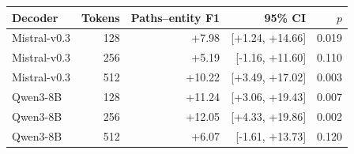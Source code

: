 \begin{tabular}{@{}lrrrr@{}}
\toprule
Decoder & Tokens & Paths--entity F1 & 95\% CI & $p$ \\
\midrule
Mistral-v0.3 & 128 & +7.98 & [+1.24, +14.66] & 0.019 \\
Mistral-v0.3 & 256 & +5.19 & [-1.16, +11.60] & 0.110 \\
Mistral-v0.3 & 512 & +10.22 & [+3.49, +17.02] & 0.003 \\
Qwen3-8B & 128 & +11.24 & [+3.06, +19.43] & 0.007 \\
Qwen3-8B & 256 & +12.05 & [+4.33, +19.86] & 0.002 \\
Qwen3-8B & 512 & +6.07 & [-1.61, +13.73] & 0.120 \\
\bottomrule
\end{tabular}
